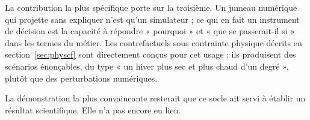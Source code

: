 La contribution la plus spécifique porte sur la troisième. Un jumeau numérique qui projette sans
expliquer n'est qu'un simulateur ; ce qui en fait un instrument de décision est la capacité à
répondre « pourquoi » et « que se passerait-il si » dans les termes du métier. Les contrefactuels
sous contrainte physique décrits en section~\ref{sec:physcf} sont directement conçus pour cet
usage : ils produisent des scénarios énonçables, du type « un hiver plus sec et plus chaud d'un
degré », plutôt que des perturbations numériques.

La démonstration la plus convaincante resterait que ce socle ait servi à établir un résultat
scientifique. Elle n'a pas encore eu lieu.
